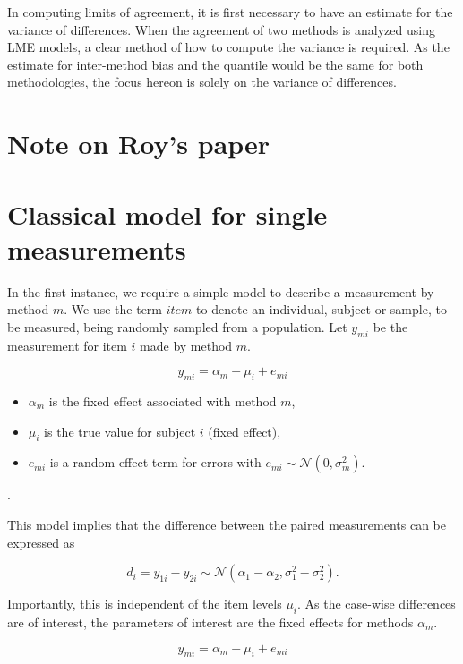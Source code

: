 \documentclass[12pt, a4paper]{article}
\theoremstyle{plain}
\theoremstyle{definition}
\theoremstyle{remark}
\begin{document}
In computing limits of agreement, it is first necessary to have an estimate for the variance of differences. When the agreement of two methods is analyzed using LME models, a clear method of how to compute the variance is required. As the estimate for inter-method bias and the quantile would be the same for both methodologies, the focus hereon is solely on the variance of differences.

\newpage

\section{Note on Roy's paper}



\section{Classical model for single measurements}
In the first instance, we require a simple model to describe a measurement by method $m$. We use the term $item$ to denote an individual, subject or sample, to be measured, being randomly sampled from a population. Let $y_{mi}$ be the measurement for item $i$ made by method $m$.

\[ y_{mi} = \alpha_{m} + \mu_{i} + e_{mi}  \]

\begin{itemize}
\item $\alpha_m$ is the fixed effect associated with method $m$,
\item $\mu_i$ is the true value for subject $i$ (fixed effect),
\item $e_{mi}$ is a
random effect term for errors with $e_{mi}  \sim \mathcal{N}(0,\sigma^2_m)$. \end{itemize}.

This model implies that the difference between the paired measurements can be expressed as

\[ d_{i} = y_{1i} - y_{2i} \sim \mathcal{N} (\alpha_{1} - \alpha_{2}, \sigma^2_{1} - \sigma^2_{2}). \]

Importantly, this is independent of the item levels $\mu_i$. As the case-wise differences are of interest, the parameters of interest are the fixed effects for methods $\alpha_{m}$.

\[ y_{mi} =  \alpha_{m}  + \mu_{i} + e_{mi}  \]

\newpage



\newpage
\end{document}
